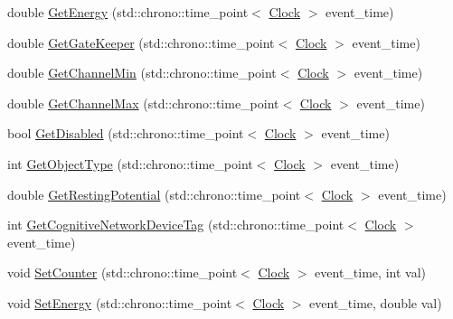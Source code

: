 \begin{DoxyCompactItemize}
\item 
double \hyperlink{class_cognitive_network_af23b9bce2587ccf3c8204be33fc76c61}{Get\+Energy} (std\+::chrono\+::time\+\_\+point$<$ \hyperlink{universe_8h_a0ef8d951d1ca5ab3cfaf7ab4c7a6fd80}{Clock} $>$ event\+\_\+time)
\item 
double \hyperlink{class_cognitive_network_a3a9be1c6697d063b0836cdcdc7a2600c}{Get\+Gate\+Keeper} (std\+::chrono\+::time\+\_\+point$<$ \hyperlink{universe_8h_a0ef8d951d1ca5ab3cfaf7ab4c7a6fd80}{Clock} $>$ event\+\_\+time)
\item 
double \hyperlink{class_cognitive_network_ad7f5cc836340017d38c22b57e177fc91}{Get\+Channel\+Min} (std\+::chrono\+::time\+\_\+point$<$ \hyperlink{universe_8h_a0ef8d951d1ca5ab3cfaf7ab4c7a6fd80}{Clock} $>$ event\+\_\+time)
\item 
double \hyperlink{class_cognitive_network_ab67da8690b83618d88f88411121d7071}{Get\+Channel\+Max} (std\+::chrono\+::time\+\_\+point$<$ \hyperlink{universe_8h_a0ef8d951d1ca5ab3cfaf7ab4c7a6fd80}{Clock} $>$ event\+\_\+time)
\item 
bool \hyperlink{class_cognitive_network_aa64c93ecec84b57b25e1fdb173795f9b}{Get\+Disabled} (std\+::chrono\+::time\+\_\+point$<$ \hyperlink{universe_8h_a0ef8d951d1ca5ab3cfaf7ab4c7a6fd80}{Clock} $>$ event\+\_\+time)
\item 
int \hyperlink{class_cognitive_network_a1c92a8f6c42788cf8ca890f062f853a3}{Get\+Object\+Type} (std\+::chrono\+::time\+\_\+point$<$ \hyperlink{universe_8h_a0ef8d951d1ca5ab3cfaf7ab4c7a6fd80}{Clock} $>$ event\+\_\+time)
\item 
double \hyperlink{class_cognitive_network_a03d744f9d0d420c1e044646bc6bd2552}{Get\+Resting\+Potential} (std\+::chrono\+::time\+\_\+point$<$ \hyperlink{universe_8h_a0ef8d951d1ca5ab3cfaf7ab4c7a6fd80}{Clock} $>$ event\+\_\+time)
\item 
int \hyperlink{class_cognitive_network_af33f3ff9dd829da73d183d2624f24964}{Get\+Cognitive\+Network\+Device\+Tag} (std\+::chrono\+::time\+\_\+point$<$ \hyperlink{universe_8h_a0ef8d951d1ca5ab3cfaf7ab4c7a6fd80}{Clock} $>$ event\+\_\+time)
\item 
void \hyperlink{class_cognitive_network_a23c6a11d9f15a141f69a9779f174bfb3}{Set\+Counter} (std\+::chrono\+::time\+\_\+point$<$ \hyperlink{universe_8h_a0ef8d951d1ca5ab3cfaf7ab4c7a6fd80}{Clock} $>$ event\+\_\+time, int val)
\item 
void \hyperlink{class_cognitive_network_af2f96107858445a0b7be2be6af5b5c01}{Set\+Energy} (std\+::chrono\+::time\+\_\+point$<$ \hyperlink{universe_8h_a0ef8d951d1ca5ab3cfaf7ab4c7a6fd80}{Clock} $>$ event\+\_\+time, double val)

\end{DoxyCompactItemize}
